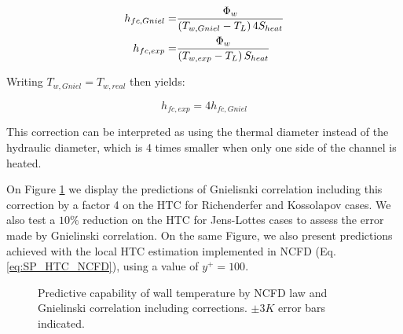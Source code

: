 \begin{align}
h_{fc,Gniel} =& \frac{\Phi_{w}}{\left( T_{w,Gniel}-T_{L} \right) 4S_{heat}} \\
h_{fc,exp} =& \frac{\Phi_{w}}{\left( T_{w,exp}-T_{L} \right) S_{heat}}
\end{align}

Writing $T_{w,Gniel}=T_{w,real}$ then yields:

\begin{equation}
h_{fc,exp}=4h_{fc,Gniel}
\end{equation}

\begin{remark*}{}
This correction can be interpreted as using the thermal diameter instead of the hydraulic diameter, which is 4 times smaller when only one side of the channel is heated.
\end{remark*}

\npar
On Figure \ref{fig:ncfd_gniel_corr_htc} we display the predictions of Gnielisnki correlation including this correction by a factor 4 on the HTC for Richenderfer and Kossolapov cases. We also test a $10\%$ reduction on the HTC for Jens-Lottes cases to assess the error made by Gnielinski correlation. On the same Figure, we also present predictions achieved with the local HTC estimation implemented in NCFD (Eq. \ref{eq:SP_HTC_NCFD}), using a value of $y^{+}=100$. 


\begin{figure}[h!]
\centering
{} 
\caption{Predictive capability of wall temperature by NCFD law and Gnielinski correlation including corrections. $\pm 3K$ error bars indicated.}
\label{fig:ncfd_gniel_corr_htc}
\end{figure}

